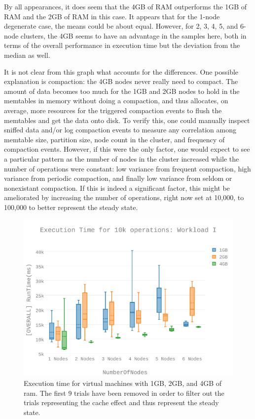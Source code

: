 By all appearances, it does seem that the 4GB of RAM outperforms the 1GB of RAM and the 2GB of RAM in this case.  It appears that for the 1-node degenerate case, the means could be about equal.  However, for 2, 3, 4, 5, and 6-node clusters, the 4GB seems to have an advantage in the samples here, both in terms of the overall performance in execution time but the deviation from the median as well.

It is not clear from this graph what accounts for the differences.  One possible explanation is compaction: the 4GB nodes never really need to compact.  The amount of data becomes too much for the 1GB and 2GB nodes to hold in the memtables in memory without doing a compaction, and thus allocates, on average, more resources for the triggered compaction events to flush the memtables and get the data onto disk.  To verify this, one could manually inspect sniffed data and/or log compaction events to measure any correlation among memtable size, partition size, node count in the cluster, and frequency of compaction events.  However, if this were the only factor, one would expect to see a particular pattern as the number of nodes in the cluster increased while the number of operations were constant:  low variance from frequent compaction, high variance from periodic compaction, and finally low variance from seldom or nonexistant compaction.  If this is indeed a significant factor, this might be ameliorated by increasing the number of operations, right now set at 10,000, to 100,000 to better represent the steady state.


\begin{figure}[h]
\includegraphics[width=7in]{Figures/figures-wli_fig4.pdf}

\caption{Execution time for virtual machines with 1GB, 2GB, and 4GB of \gls{ram}.  The first 9 trials have been removed in order to filter out the trials representing the cache effect and thus represent the steady state.}

\label{fig:figures-wli_fig4}
\end{figure}

